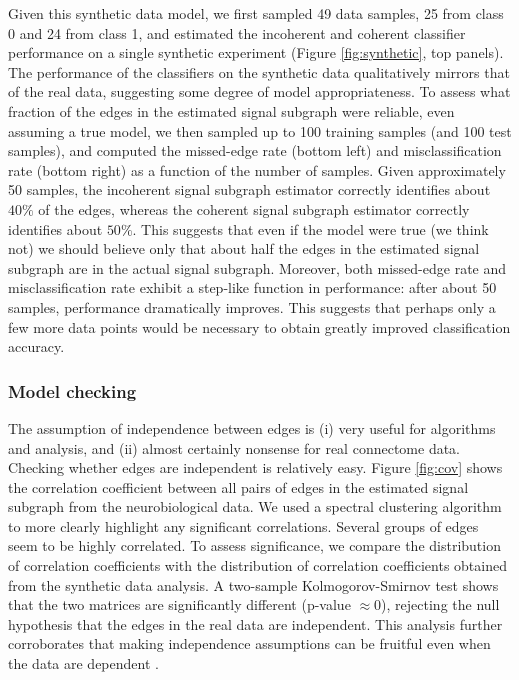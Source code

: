 \documentclass[10pt,journal,cspaper,compsoc]{IEEEtran}
\begin{document}
Given this synthetic data model, we first sampled 49 data samples, 25 from class 0 and 24 from class 1, and estimated the incoherent and coherent classifier performance on a single synthetic experiment (Figure \ref{fig:synthetic}, top panels).  The performance of the classifiers on the synthetic data qualitatively mirrors that of the real data, suggesting some degree of model appropriateness.  To assess what fraction of the edges in the estimated signal subgraph were reliable, even assuming a true model, we then sampled up to 100 training samples (and 100 test samples), and computed the missed-edge rate (bottom left) and misclassification rate (bottom right) as a function of the number of samples.  Given approximately 50 samples, the incoherent signal subgraph estimator correctly identifies about $40\%$ of the edges, whereas the coherent signal subgraph estimator correctly identifies about $50\%$.  This suggests that even if the model were true (we think not) we should believe only that about half the edges in the estimated signal subgraph are in the actual signal subgraph.  Moreover, both missed-edge rate and misclassification rate exhibit a step-like function in performance: after about 50 samples, performance dramatically improves.  This suggests that perhaps only a few more data points would be necessary to obtain greatly improved classification accuracy.  


\subsubsection{Model checking} %
\label{ssub:model_checking}


The assumption of independence between edges is (i) very useful for algorithms and analysis, and (ii) almost certainly nonsense for real connectome data.  Checking whether edges are independent is relatively easy.  Figure \ref{fig:cov} shows the correlation coefficient between all pairs of edges in the estimated signal subgraph from the neurobiological data.  We used a spectral clustering algorithm \cite{Dhillon2001} to  more clearly highlight any significant correlations.  Several groups of edges seem to be highly correlated.  To assess significance, we compare the distribution of correlation coefficients with the distribution of correlation coefficients obtained from the synthetic data analysis.  A two-sample Kolmogorov-Smirnov test shows that the two matrices are significantly different (p-value $\approx 0$), rejecting the null hypothesis that the edges in the real data are independent. This analysis further corroborates that making independence assumptions can be fruitful even when the data are dependent \cite{Hand2001}.
\end{document}
